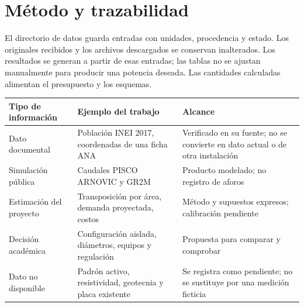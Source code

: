 \section{Método y trazabilidad}
El directorio de datos guarda entradas con unidades, procedencia y estado. Los originales recibidos y los archivos descargados se conservan inalterados. Los resultados se generan a partir de esas entradas; las tablas no se ajustan manualmente para producir una potencia deseada. Las cantidades calculadas alimentan el presupuesto y los esquemas.

\begingroup\small
\begin{longtable}{L{3.2cm}L{6cm}L{4.8cm}}
\toprule Tipo de información & Ejemplo del trabajo & Alcance\\\midrule
Dato documental & Población INEI 2017, coordenadas de una ficha ANA & Verificado en su fuente; no se convierte en dato actual o de otra instalación\\
Simulación pública & Caudales PISCO ARNOVIC y GR2M & Producto modelado; no registro de aforos\\
Estimación del proyecto & Transposición por área, demanda proyectada, costos & Método y supuestos expresos; calibración pendiente\\
Decisión académica & Configuración aislada, diámetros, equipos y regulación & Propuesta para comparar y comprobar\\
Dato no disponible & Padrón activo, resistividad, geotecnia y placa existente & Se registra como pendiente; no se sustituye por una medición ficticia\\
\bottomrule\end{longtable}\endgroup
